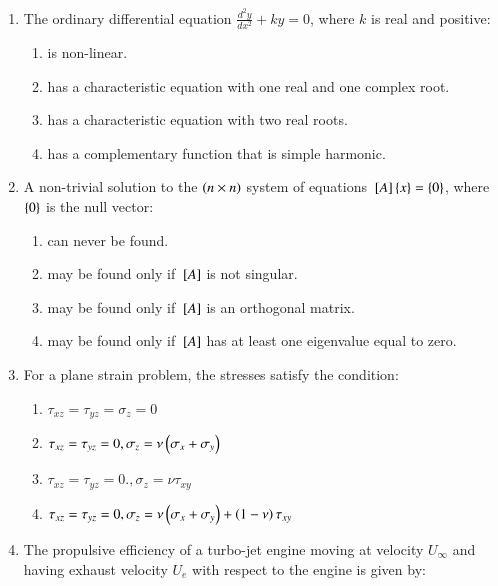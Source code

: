 \documentclass[journal,12pt,onecolumn]{IEEEtran}
\theoremstyle{remark}
\begin{document}
\begin{enumerate}
\begin{enumerate}
\end{enumerate}
\item The ordinary differential equation $\frac{d^2y}{dx^2}+ky=0$, where $k$ is real and positive:
\begin{enumerate}
\item is non-linear.
\item has a characteristic equation with one real and one complex root.
\item has a characteristic equation with two real roots.
\item has a complementary function that is simple harmonic.
\end{enumerate}
\item A non-trivial solution to the $\left(n\times n\right)$ system of equations ${}\left[A\right]\left\{x\right\} = \left\{0\right\}$, where $\left\{0\right\}$ is the null vector:
\begin{enumerate}
\item can never be found.
\item may be found only if ${}\left[A\right]$ is not singular.
\item may be found only if ${}\left[A\right]$ is an orthogonal matrix.
\item may be found only if ${}\left[A\right]$ has at least one eigenvalue equal to zero.
\end{enumerate}
\item For a plane strain problem, the stresses satisfy the condition:
\begin{enumerate}
\item $\tau_{xz}=\tau_{yz}=\sigma_z=0$
\item $\tau_{xz}=\tau_{yz}=0,\sigma_z=\nu\left(\sigma_x+\sigma_y\right)$
\item $\tau_{xz}=\tau_{yz}=0.,\sigma_z=\nu\tau_{xy}$
\item $\tau_{xz}=\tau_{yz}=0,\sigma_z=\nu\left(\sigma_x+\sigma_y\right)+\left(1-\nu\right)\tau_{xy}$
\end{enumerate}
\item The propulsive efficiency of a turbo-jet engine moving at velocity $U_\infty$ and having exhaust velocity $U_e$ with respect to the engine is given by:
\begin{enumerate}
\begin{multicols}{4}

\end{multicols}
\end{enumerate}
\end{enumerate}
\end{document}
